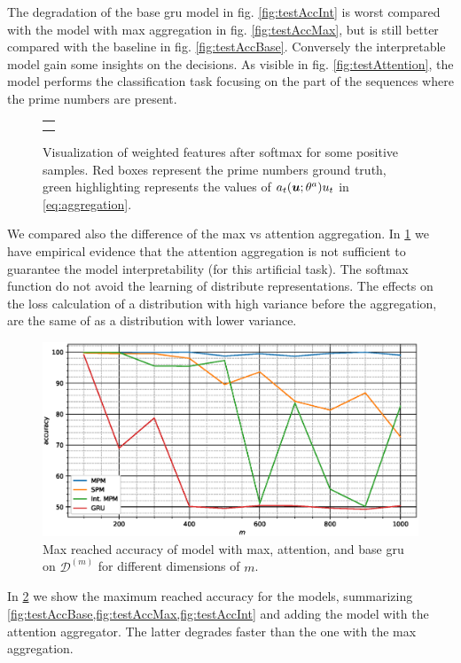 The degradation of the base \ac{gru} model in fig. \ref{fig:testAccInt} is worst
compared with the model with max aggregation in fig. \ref{fig:testAccMax},
but is still better compared with the baseline in
fig. \ref{fig:testAccBase}. Conversely the interpretable model gain
some insights on the decisions. As visible in
fig. \ref{fig:testAttention}, the model performs the classification
task focusing on 
the part of the sequences where the prime numbers are present.

\begin{figure}
  \centering
  \footnotesize
  \begin{tabular}{|p{\floatwidth}|}
    \hline
    \\
    \hline
    \\
    \hline
    \\
    \hline
  \end{tabular}
  \caption{Visualization of weighted features after softmax for some
    positive samples. Red boxes represent the prime numbers ground
    truth, green highlighting represents the values of
    $a_t(\bm{u};\theta^a)u_t$ in
    \eqref{eq:aggregation}.}
  \label{fig:testAttentionSoft}
\end{figure}
We compared also the difference of the max vs attention aggregation. In
\cref{fig:testAttentionSoft} we have empirical evidence that the
attention aggregation is not sufficient to guarantee the model
interpretability (for this artificial task). The softmax function do
not avoid the learning of 
distribute representations. The effects on the loss calculation of a
distribution with high variance before the aggregation, are the 
same of as a distribution with lower variance.

\begin{figure}
  \centering
  \includegraphics[width=\floatwidth]{imgMax/maxBaseDiff.eps}
  \caption{Max reached accuracy of model with max, attention, and base \ac{gru} on $\mathcal{D}^{(m)}$ for different dimensions of $m$.}
  \label{fig:testAccDiff}
\end{figure}
In \cref{fig:testAccDiff} we show the maximum reached accuracy for the
models, summarizing
\cref{fig:testAccBase,fig:testAccMax,fig:testAccInt} and adding the
model with the attention aggregator. The latter degrades faster than the
one with the max aggregation.

